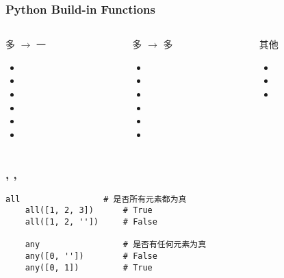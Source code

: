 \begin{CJK}{UTF8}{gbsn}
\begin{frame} [fragile]
	\frametitle{Python Build-in Functions}
	\linespread{1.5}
	\begin{columns}[T]
		\begin{column}[T]{.333333\textwidth}
			多 $\to$ 一
			\begin{itemize}
				\item {}
				\item {}
				\item {}
				\item {}
				\item {}
				\item {}
			\end{itemize}
		\end{column}
		\begin{column}[T]{.333333\textwidth}
			多 $\to$ 多
			\begin{itemize}
				\item {}
				\item {}
				\item {}
				\item {}
				\item {}
				\item {}
			\end{itemize}
		\end{column}
		\begin{column}[T]{.333333\textwidth}
			其他
			\begin{itemize}
				\item {}
				\item {}
				\item {}
			\end{itemize}
		\end{column}
	\end{columns}
\end{frame}

\begin{frame} [fragile]
	\frametitle{, , }
	\linespread{1.5}
	\begin{lstlisting}[style=pythonstyle, gobble=4, texcl]
	all					# 是否所有元素都为真
	all([1, 2, 3])		# True
	all([1, 2, ''])		# False

	any					# 是否有任何元素为真
	any([0, ''])		# False
	any([0, 1])			# True


\end{lstlisting}
\end{frame}
\end{CJK}
